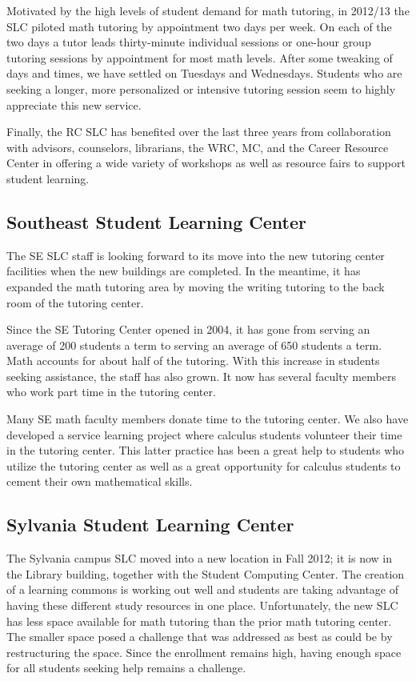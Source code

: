 Motivated by the high levels of student demand for math tutoring, in 2012/13 the SLC piloted math tutoring by appointment two days per week. On each of the two days a tutor leads thirty-minute individual sessions or one-hour group tutoring sessions by appointment for most math levels.  After some tweaking of days and times, we have settled on Tuesdays and Wednesdays.  Students who are seeking a longer, more personalized or intensive tutoring session seem to highly appreciate this new service.  

Finally, the RC SLC has benefited over the last three years from collaboration with advisors, counselors, librarians, the WRC, MC, and the Career Resource Center in offering a wide variety of workshops as well as resource fairs to support student learning. 

\subsection{Southeast Student Learning Center}
The SE SLC staff is looking forward to its move into the new tutoring center facilities when the new buildings are completed. In the meantime, it has expanded the math tutoring area by moving the writing tutoring to the back room of the tutoring center.  

Since the SE Tutoring Center opened in 2004, it has gone from serving an average of 200 students a term to serving an average of 650 students a term. Math accounts for about half of the tutoring.  With this increase in students seeking assistance, the staff has also grown. It now has several faculty members who work part time in the tutoring center. 

Many SE math faculty members donate time to the tutoring center. We also have developed a service learning project where calculus students volunteer their time in the tutoring center. This latter practice has been a great help to students who utilize the tutoring center as well as a great opportunity for calculus students to cement their own mathematical skills.

\subsection{Sylvania Student Learning Center}
The Sylvania campus SLC moved into a new location in Fall 2012; it is now in the Library building, together with the Student Computing Center. The creation of a learning commons is working out well and students are taking advantage of having these different study resources in one place. Unfortunately, the new SLC has less space available for math tutoring than the prior math tutoring center.  The  smaller space posed a challenge that was addressed as best as could be by restructuring the space. Since the enrollment remains high, having enough space for all students seeking help remains a challenge.


